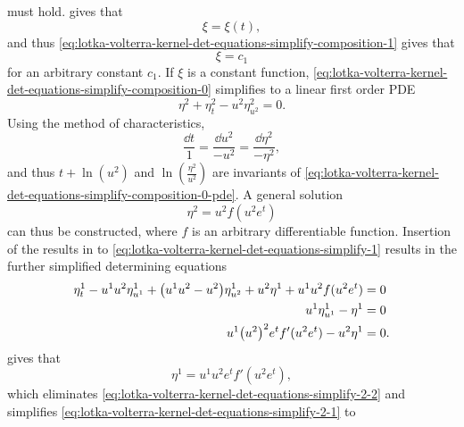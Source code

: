 must hold.
 gives that
\begin{equation}
  \xi = \xi(t),
\end{equation}
and thus \cref{eq:lotka-volterra-kernel-det-equations-simplify-composition-1} gives that
\begin{equation}
  \xi = c_1
\end{equation}
for an arbitrary constant \(c_1\).
If \(\xi\) is a constant function, \cref{eq:lotka-volterra-kernel-det-equations-simplify-composition-0} simplifies to a linear first order PDE
\begin{equation}
  \eta^2 + \eta^2_t - u^2 \eta^2_{u^2} = 0.
\end{equation}
Using the method of characteristics,
\begin{equation}\label{eq:lotka-volterra-kernel-det-equations-simplify-composition-0-pde}
  \frac{\dd{t}}{1} = \frac{\dd{u^2}}{-u^2} = \frac{\dd{\eta^2}}{-\eta^2},
\end{equation}
and thus \(t + \ln(u^2)\) and \(\ln(\frac{\eta^2}{u^2})\) are invariants of \cref{eq:lotka-volterra-kernel-det-equations-simplify-composition-0-pde}.
A general solution
\begin{equation}
  \eta^2 = u^2 f(u^2 e^t)
\end{equation}
can thus be constructed, where \(f\) is an arbitrary differentiable function.
Insertion of the results in to \cref{eq:lotka-volterra-kernel-det-equations-simplify-1} results in the further simplified determining equations
\begin{subequations}\label{eq:lotka-volterra-kernel-det-equations-simplify-2}
  \begin{align}
    \label{eq:lotka-volterra-kernel-det-equations-simplify-2-1}
      \eta^1_t - u^1 u^2 \eta^1_{u^1} + \qty(u^1 u^2 - u^2) \eta^1_{u^2} + u^2 \eta^1 + u^1 u^2 f(u^2 e^t) &= 0 \\
    \label{eq:lotka-volterra-kernel-det-equations-simplify-2-2}
    u^1 \eta^1_{u^1} - \eta^1 &= 0 \\
    \label{eq:lotka-volterra-kernel-det-equations-simplify-2-4}
    u^1 \qty(u^2)^2 e^t f'(u^2 e^t) - u^2 \eta^1 &= 0.
  \end{align}
\end{subequations}
 gives that
\begin{equation}
  \eta^1 = u^1 u^2 e^t f'(u^2 e^t),
\end{equation}
which eliminates \cref{eq:lotka-volterra-kernel-det-equations-simplify-2-2} and simplifies \cref{eq:lotka-volterra-kernel-det-equations-simplify-2-1} to

